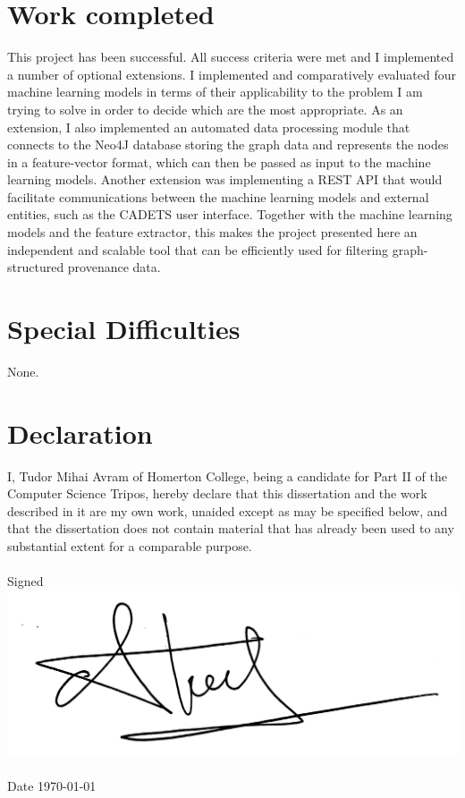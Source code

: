 \documentclass[12pt,a4paper,twoside,openright]{report}
\begin{document}
\section*{Work completed}
This project has been successful. All success criteria were met and I implemented a number of optional extensions. I implemented and comparatively evaluated four machine learning models in terms of their applicability to the problem I am trying to solve in order to decide which are the most appropriate.  As an extension, I also implemented an automated data processing module that connects to the Neo4J database storing the graph data and represents the nodes in a feature-vector format, which can then be passed as input to the machine learning models. Another extension was implementing a REST API that would facilitate communications between the machine learning models and external entities, such as the CADETS user interface. Together with the machine learning models and the feature extractor, this makes the project presented here an independent and scalable tool that can be efficiently used for filtering graph-structured provenance data.
\section*{Special Difficulties}
None.
\newpage

\section*{Declaration}
I, Tudor Mihai Avram of Homerton College,
being a candidate for Part II of the Computer Science Tripos,
hereby declare that this dissertation and the work described in it
are my own work, unaided except as may be specified below, and
that the dissertation does not contain material that has already
been used to any substantial extent for a comparable purpose.
\\ \\ 
Signed 
\includegraphics[height=2\baselineskip]{graphics/signature}
\\ \\ 
Date \today
\end{document}
